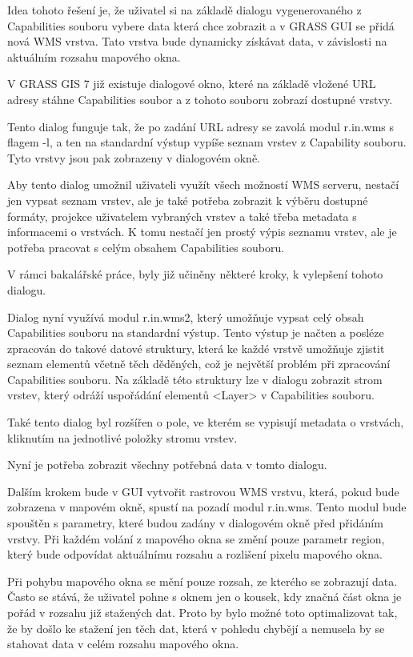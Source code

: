 \documentclass[a4paper,12pt]{article}
\begin{document}
Idea tohoto řešení je, že uživatel si na základě dialogu vygenerovaného z Capabilities souboru vybere data která chce zobrazit a v GRASS GUI se přidá nová WMS vrstva. Tato vrstva bude dynamicky získávat data, v závislosti na aktuálním rozsahu mapového okna. 

V GRASS GIS 7 již existuje dialogové okno, které na základě vložené URL adresy stáhne Capabilities soubor a z tohoto souboru zobrazí dostupné vrstvy. 

Tento dialog funguje tak, že po zadání URL adresy se zavolá modul r.in.wms s flagem -l, a ten na standardní výstup vypíše seznam vrstev z Capability souboru. Tyto vrstvy jsou pak zobrazeny v dialogovém okně.

Aby tento dialog umožnil uživateli využít všech možností WMS serveru, nestačí jen vypsat seznam vrstev, ale je také potřeba zobrazit k výběru dostupné formáty, projekce uživatelem vybraných vrstev a také třeba metadata s informacemi o vrstvách. K tomu nestačí jen prostý výpis seznamu vrstev, ale je potřeba pracovat s celým obsahem Capabilities souboru. 

V rámci bakalářské práce, byly již učiněny některé kroky, k vylepšení tohoto dialogu. 

Dialog nyní využívá modul r.in.wms2, který umožňuje vypsat celý obsah Capabilities souboru na standardní výstup. Tento výstup je načten a posléze zpracován do takové datové struktury, která ke každé vrstvě umožňuje zjistit seznam elementů  včetně těch děděných, což je největší problém při zpracování Capabilities souboru. Na základě této struktury lze v dialogu zobrazit strom  vrstev, který odráží uspořádání elementů <Layer> v Capabilities souboru. 

Také tento dialog byl rozšířen o pole, ve kterém se vypisují metadata o vrstvách, kliknutím na jednotlivé položky stromu vrstev. 

Nyní je potřeba zobrazit všechny potřebná data v tomto dialogu.

 Dalším krokem bude v GUI vytvořit rastrovou WMS vrstvu, která, pokud bude zobrazena v mapovém okně, spustí na pozadí modul r.in.wms. Tento modul bude spouštěn s parametry, které budou zadány v dialogovém okně před přidáním vrstvy. Při každém volání z mapového okna se změní pouze parametr region, který bude odpovídat aktuálnímu rozsahu a rozlišení pixelu  mapového okna.
 
Při pohybu mapového okna se mění pouze rozsah, ze kterého se zobrazují data. Často se stává, že uživatel pohne s oknem jen o kousek, kdy značná část okna je pořád v rozsahu již stažených dat. Proto by bylo možné toto optimalizovat tak, že by došlo ke stažení jen těch dat, která v pohledu chybějí a nemusela by se stahovat data v celém rozsahu mapového okna.
\end{document}
